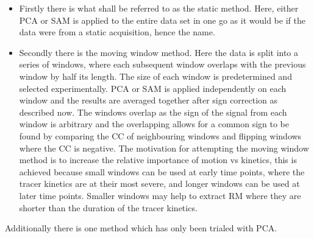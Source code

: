                     \begin{itemize}
                        \item Firstly there is what shall be referred to as the static method. Here, either \gls{PCA} or \gls{SAM} is applied to the entire data set in one go as it would be if the data were from a static acquisition, hence the name.
                        
                        \item Secondly there is the moving window method. Here the data is split into a series of windows, where each subsequent window overlaps with the previous window by half its length. The size of each window is predetermined and selected experimentally. \gls{PCA} or \gls{SAM} is applied independently on each window and the results are averaged together after sign correction as described now. The windows overlap as the sign of the signal from each window is arbitrary and the overlapping allows for a common sign to be found by comparing the \gls{CC} of neighbouring windows and flipping windows where the \gls{CC} is negative. The motivation for attempting the moving window method is to increase the relative importance of motion vs kinetics, this is achieved because small windows can be used at early time points, where the tracer kinetics are at their most severe, and longer windows can be used at later time points. Smaller windows may help to extract \gls{RM} where they are shorter than the duration of the tracer kinetics.
                    \end{itemize}
                    
                    Additionally there is one method which has only been trialed with \gls{PCA}.
                    
